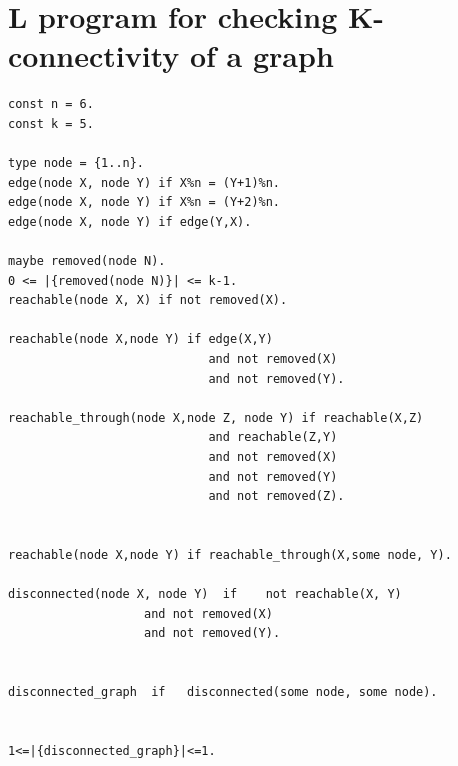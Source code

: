 \documentclass[a4paper,10pt]{article}
\begin{document}
\section{L program for checking K-connectivity of a graph}\label{B}
\begin{verbatim}
const n = 6.
const k = 5.

type node = {1..n}.
edge(node X, node Y) if X%n = (Y+1)%n.
edge(node X, node Y) if X%n = (Y+2)%n.
edge(node X, node Y) if edge(Y,X).

maybe removed(node N).
0 <= |{removed(node N)}| <= k-1.
reachable(node X, X) if not removed(X).

reachable(node X,node Y) if edge(X,Y) 
                            and not removed(X)                                                                                                               
                            and not removed(Y). 

reachable_through(node X,node Z, node Y) if reachable(X,Z)
                            and reachable(Z,Y) 
                            and not removed(X) 
                            and not removed(Y) 
                            and not removed(Z).
                            

reachable(node X,node Y) if reachable_through(X,some node, Y).

disconnected(node X, node Y)  if    not reachable(X, Y) 
                   and not removed(X)
                   and not removed(Y).                


disconnected_graph  if   disconnected(some node, some node).                 


1<=|{disconnected_graph}|<=1.
\end{verbatim}
%
%
\end{document}
